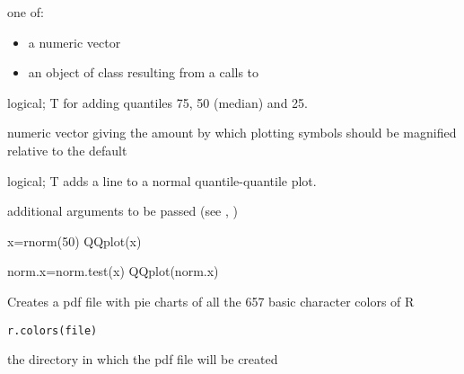 \documentclass[a4paper]{book}
\begin{document}
%
\begin{Arguments}
\begin{ldescription}
\item[\code{dat}] one of:
\begin{itemize}

\item a numeric vector
\item an object of class  resulting from a
calls to 

\end{itemize}


\item[\code{quant}] logical; T for adding quantiles 75, 50 (median) and 25.
\item[\code{cex.q}] numeric vector giving the amount by which plotting symbols should be magnified relative to the default
\item[\code{norm}] logical; T adds a line to a normal quantile-quantile plot.
\item[\code{...}] additional arguments to be passed (see , )
\end{ldescription}
\end{Arguments}
%
\begin{Examples}
\begin{ExampleCode}
x=rnorm(50)
QQplot(x)

norm.x=norm.test(x)
QQplot(norm.x)  
\end{ExampleCode}
\end{Examples}
\newpage
{}
%
\begin{Description}\relax
Creates a pdf file with pie charts of all the 657 basic character colors of R
\end{Description}
%
\begin{Usage}
\begin{verbatim}
r.colors(file)
\end{verbatim}
\end{Usage}
%
\begin{Arguments}
\begin{ldescription}
\item[\code{file}] 
the directory in which the pdf file will be created


\end{ldescription}
\end{Arguments}
\end{document}
